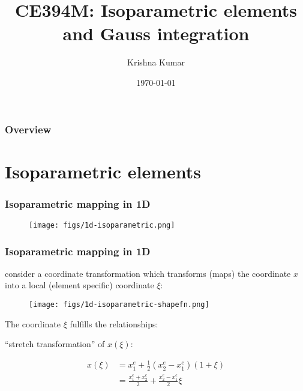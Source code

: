 \documentclass[notes]{beamer}
\title[CE394M: isoparametric - gauss integration]{CE394M: Isoparametric elements and Gauss integration}
\author{Krishna Kumar} %
\institute[UT Austin] %
{
University of Texas at Austin \\
\medskip
\textit{
  \url{krishnak@utexas.edu}} %
}
\date{\today} %
\begin{document}
\begin{frame}
\titlepage %
\end{frame}

\begin{frame}
 \frametitle{Overview}
 \tableofcontents
\end{frame}

\section{Isoparametric elements}
\begin{frame}
\frametitle{Isoparametric mapping in 1D}
\begin{figure}[ht]
	\centering
	\texttt{[image: figs/1d-isoparametric.png]}
\end{figure}
\end{frame}

\begin{frame}
\frametitle{Isoparametric mapping in 1D}
consider a coordinate transformation which transforms (maps) the coordinate $x$ into a local (element specific) coordinate $\xi$:	
\begin{figure}[ht]
	\centering
	\texttt{[image: figs/1d-isoparametric-shapefn.png]}
\end{figure}
The coordinate $\xi$ fulfills the relationships:


``stretch transformation'' of $x(\xi)$: 

\begin{align*}
	x(\xi) & = x_1^e + \frac{1}{2}(x_2^e - x_1^e)(1+\xi) \\
		& = \frac{x_1^e + x_2^e}{2} + \frac{x_2^e - x_1^e}{2}\xi
\end{align*}
\end{frame}
\end{document}
